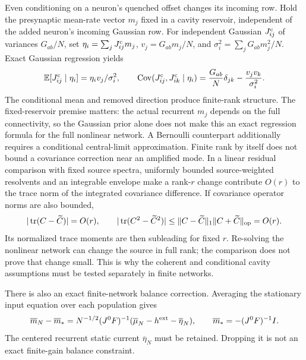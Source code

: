 Even conditioning on a neuron's quenched offset changes its incoming row.
Hold the presynaptic mean-rate vector $m_j$ fixed in a cavity reservoir,
independent of the added neuron's incoming Gaussian row. For independent
Gaussian $J_{ij}^{\rm c}$ of variances $G_{ab}/N$, set
$\eta_i=\sum_jJ_{ij}^{\rm c}m_j$, $v_j=G_{ab}m_j/N$, and
$\sigma_i^2=\sum_jG_{ab}m_j^2/N$. Exact Gaussian regression yields
\begin{equation}
 \mathbb E[J_{ij}^{\rm c}\mid\eta_i]=\eta_i v_j/\sigma_i^2,
 \qquad
 \operatorname{Cov}(J_{ij}^{\rm c},J_{ik}^{\rm c}\mid\eta_i)
   =\frac{G_{ab}}N\delta_{jk}-\frac{v_jv_k}{\sigma_i^2}.
 \label{eq:an_row_regression}
\end{equation}
The conditional mean and removed direction produce finite-rank structure.
The fixed-reservoir premise matters: the actual recurrent $m_j$ depends on
the full connectivity, so the Gaussian prior alone does not make this an
exact regression formula for the full nonlinear network. A Bernoulli
counterpart additionally requires a conditional central-limit approximation.
Finite rank by itself does not bound a covariance correction near an
amplified mode. In a linear residual comparison with fixed source spectra,
uniformly bounded source-weighted resolvents and an integrable envelope make
a rank-$r$ change contribute $O(r)$ to the trace norm of the integrated
covariance difference. If covariance operator norms are also bounded,
\begin{equation}
 |\operatorname{tr}(C-\widetilde C)|=O(r),\qquad
 |\operatorname{tr}(C^2-\widetilde C^2)|
 \leq\|C-\widetilde C\|_1\|C+\widetilde C\|_{\rm op}=O(r).
\end{equation}
Its normalized trace moments are then subleading for fixed $r$. Re-solving
the nonlinear network can change the source in full rank; the comparison
does not prove that change small. This is why the coherent and conditional
cavity assumptions must be tested separately in finite networks.

There is also an exact finite-network balance correction. Averaging the
stationary input equation over each population gives
\begin{equation}
 \overline m_N-\overline m_*=
 N^{-1/2}(J^0F)^{-1}
   (\overline\mu_N-h^{\rm ext}-\overline\eta_N),
 \qquad \overline m_*=-(J^0F)^{-1}I.
 \label{eq:an_finite_balance}
\end{equation}
The centered recurrent static current $\overline\eta_N$ must be retained.
Dropping it is not an exact finite-gain balance constraint.

